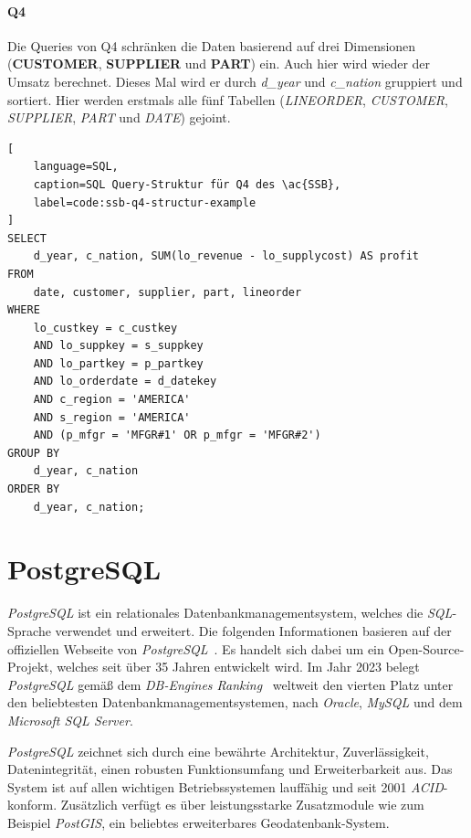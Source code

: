 \paragraph{Q4}
Die Queries von Q4 schränken die Daten basierend auf drei Dimensionen (\textbf{CUSTOMER}, \textbf{SUPPLIER} und \textbf{PART}) ein.
Auch hier wird wieder der Umsatz berechnet.
Dieses Mal wird er durch \emph{d\_year} und \emph{c\_nation} gruppiert und sortiert.
Hier werden erstmals alle fünf Tabellen (\emph{LINEORDER}, \emph{CUSTOMER}, \emph{SUPPLIER}, \emph{PART} und \emph{DATE}) gejoint.

\begin{lstlisting}[
    language=SQL,
    caption=SQL Query-Struktur für Q4 des \ac{SSB},
    label=code:ssb-q4-structur-example
]
SELECT 
    d_year, c_nation, SUM(lo_revenue - lo_supplycost) AS profit
FROM 
    date, customer, supplier, part, lineorder
WHERE 
    lo_custkey = c_custkey
    AND lo_suppkey = s_suppkey
    AND lo_partkey = p_partkey
    AND lo_orderdate = d_datekey
    AND c_region = 'AMERICA'
    AND s_region = 'AMERICA'
    AND (p_mfgr = 'MFGR#1' OR p_mfgr = 'MFGR#2')
GROUP BY 
    d_year, c_nation
ORDER BY 
    d_year, c_nation;

\end{lstlisting}

\section{PostgreSQL}
\emph{PostgreSQL} ist ein relationales Datenbankmanagementsystem, welches die \emph{SQL}-Sprache verwendet und erweitert. Die folgenden Informationen basieren auf der offiziellen Webseite von \emph{PostgreSQL}~\cite{the_postgresql_global_development_group_postgresql_nodate}. Es handelt sich dabei um ein Open-Source-Projekt, welches seit über 35 Jahren entwickelt wird. Im Jahr 2023 belegt \emph{PostgreSQL} gemäß dem \emph{DB-Engines Ranking}~\cite{db-engines_most_2023} weltweit den vierten Platz unter den beliebtesten Datenbankmanagementsystemen, nach \emph{Oracle}, \emph{MySQL} und dem \emph{Microsoft SQL Server}.

\emph{PostgreSQL} zeichnet sich durch eine bewährte Architektur, Zuverlässigkeit, Datenintegrität, einen robusten Funktionsumfang und Erweiterbarkeit aus. Das System ist auf allen wichtigen Betriebssystemen lauffähig und seit 2001 \emph{ACID}-konform.  Zusätzlich verfügt es über leistungsstarke Zusatzmodule wie zum Beispiel \emph{PostGIS}, ein beliebtes erweiterbares Geodatenbank-System.

